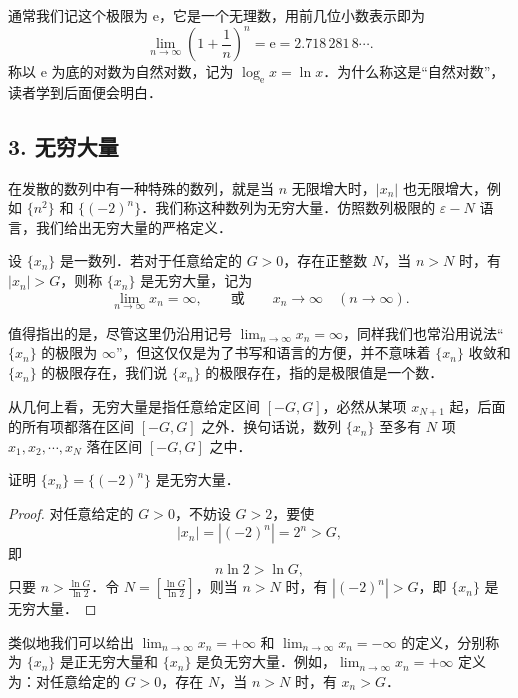通常我们记这个极限为 $\mathrm{e}$，它是一个无理数，用前几位小数表示即为
\[
\lim_{n\to\infty}\left(1+\frac{1}{n}\right)^n = \mathrm{e} = 2.718\,281\,8\cdots.
\]
称以 $\mathrm{e}$ 为底的对数为自然对数，记为 $\log_{\mathrm{e}}x = \ln x$．为什么称这是``自然对数''，读者学到后面便会明白．

\subsection*{3. 无穷大量}

在发散的数列中有一种特殊的数列，就是当 $n$ 无限增大时，$|x_n|$ 也无限增大，例如 $\{n^2\}$ 和 $\{(-2)^n\}$．我们称这种数列为无穷大量．仿照数列极限的 $\varepsilon-N$ 语言，我们给出无穷大量的严格定义．

\begin{definition}\label{def:3-4}
设 $\{x_n\}$ 是一数列．若对于任意给定的 $G > 0$，存在正整数 $N$，当 $n > N$ 时，有 $|x_n| > G$，则称 $\{x_n\}$ 是无穷大量，记为
\[
\lim_{n\to\infty}x_n = \infty,\qquad \text{或}\qquad x_n \to \infty\quad(n\to\infty).
\]
\end{definition}

值得指出的是，尽管这里仍沿用记号 $\lim_{n\to\infty}x_n = \infty$，同样我们也常沿用说法``$\{x_n\}$ 的极限为 $\infty$''，但这仅仅是为了书写和语言的方便，并不意味着 $\{x_n\}$ 收敛和 $\{x_n\}$ 的极限存在，我们说 $\{x_n\}$ 的极限存在，指的是极限值是一个数．

从几何上看，无穷大量是指任意给定区间 $[-G,G]$，必然从某项 $x_{N+1}$ 起，后面的所有项都落在区间 $[-G,G]$ 之外．换句话说，数列 $\{x_n\}$ 至多有 $N$ 项 $x_1, x_2, \cdots, x_N$ 落在区间 $[-G,G]$ 之中．

\begin{example}\label{ex:3-2-16}
证明 $\{x_n\} = \{(-2)^n\}$ 是无穷大量．
\end{example}

\begin{proof}
对任意给定的 $G>0$，不妨设 $G>2$，要使
\[
|x_n| = |(-2)^n| = 2^n > G,
\]
即
\[
n\ln2 > \ln G,
\]
只要 $n > \frac{\ln G}{\ln 2}$．令 $N = \left[\frac{\ln G}{\ln 2}\right]$，则当 $n > N$ 时，有 $|(-2)^n| > G$，即 $\{x_n\}$ 是无穷大量．
\end{proof}

类似地我们可以给出 $\lim_{n\to\infty}x_n = +\infty$ 和 $\lim_{n\to\infty}x_n = -\infty$ 的定义，分别称为 $\{x_n\}$ 是正无穷大量和 $\{x_n\}$ 是负无穷大量．例如，$\lim_{n\to\infty}x_n = +\infty$ 定义为：对任意给定的 $G>0$，存在 $N$，当 $n>N$ 时，有 $x_n > G$．

